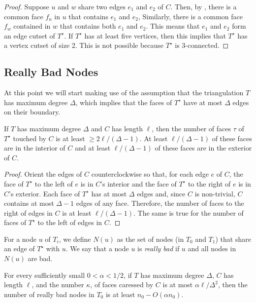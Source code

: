 \documentclass{patmorin}
\newcommand{\dual}[1]{{#1}^\star}
\begin{document}
\begin{proof}
   Suppose $u$ and $w$ share two edges $e_1$ and $e_2$ of $C$.  Then, by
   , there is a common face $f_u$ in $u$ that contains
   $e_1$ and $e_2$, Similarly, there is a common face $f_w$ contained
   in $w$ that contains both $e_1$ and $e_2$.  This means that $e_1$ and
   $e_2$ form an edge cutset of $\dual{T}$.  If $\dual{T}$ has at least
   five vertices, then this implies that $\dual{T}$ has a vertex cutset
   of size 2.  This is not possible because $\dual{T}$ is 3-connected.
\end{proof}



\subsection{Really Bad Nodes}


At this point we will start making use of the assumption that the
triangulation $T$ has maximum degree $\Delta$, which implies that the
faces of $\dual{T}$ have at most $\Delta$ edges on their boundary.

\begin{obs}
  If $T$ has maximum degree $\Delta$ and $C$ has length $\ell$, then
  the number of faces $\tau$ of $\dual{T}$ touched by $C$ is at least $\ge
  2\ell/(\Delta-1)$.  At least $\ell/(\Delta-1)$ of these faces are in
  the interior of $C$ and at least $\ell/(\Delta-1)$ of these faces are
  in the exterior of $C$.
\end{obs}

\begin{proof}
  Orient the edges of $C$ counterclockwise so that, for each edge
  $e$ of $C$, the face of $\dual{T}$ to the left of $e$ is in $C$'s
  interior and the face of $\dual{T}$ to the right of $e$ is in $C$'s
  exterior.  Each face of $\dual{T}$ has at most $\Delta$ edges and,
  since $C$ is non-trivial, $C$ contains at most $\Delta-1$ edges of any
  face. Therefore, the number of faces to the right of edges in $C$ is
  at least $\ell/(\Delta-1)$. The same is true for the number of faces
  of $\dual{T}$ to the left of edges in $C$.
\end{proof}

For a node $u$ of $T_i$, we define $N(u)$ as the set of nodes (in $T_0$
and $T_1$) that share an edge of $\dual{T}$ with $u$.  We say that a
node $u$ is \emph{really bad} if $u$ and all nodes in $N(u)$ are bad.

\begin{lem}
  For every sufficiently small $0<\alpha < 1/2$,  
  if $T$ has maximum degree $\Delta$, $C$ has length $\ell$, and the number
  $\kappa$, of faces caressed by $C$ is at most $\alpha\ell/\Delta^2$, then
  the number of really bad nodes in $T_0$ is at least $n_0-O(\alpha n_0)$.
\end{lem}
\end{document}
